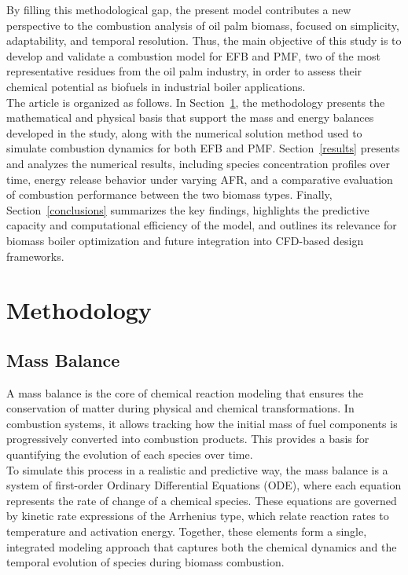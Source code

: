 \documentclass[preprint,12pt]{elsarticle}
\begin{document}
By filling this methodological gap, the present model contributes a new perspective to the combustion analysis of oil palm biomass, focused on simplicity, adaptability, and temporal resolution. Thus, the main objective of this study is to develop and validate a combustion model for EFB and PMF, two of the most representative residues from the oil palm industry, in order to assess their chemical potential as biofuels in industrial boiler applications.\\

The article is organized as follows. In Section~\ref{methodology}, the methodology presents the mathematical and physical basis that support the mass and energy balances developed in the study, along with the numerical solution method used to simulate combustion dynamics for both EFB and PMF. Section~\ref{results} presents and analyzes the numerical results, including species concentration profiles over time, energy release behavior under varying AFR, and a comparative evaluation of combustion performance between the two biomass types. Finally, Section~\ref{conclusions} summarizes the key findings, highlights the predictive capacity and computational efficiency of the model, and outlines its relevance for biomass boiler optimization and future integration into CFD-based design frameworks.

\section{Methodology} \label{methodology}

\subsection{Mass Balance}

A mass balance is the core of chemical reaction modeling that ensures the conservation of matter during physical and chemical transformations. In combustion systems, it allows tracking how the initial mass of fuel components is progressively converted into combustion products. This provides a basis for quantifying the evolution of each species over time.\\

To simulate this process in a realistic and predictive way, the mass balance is a system of first-order Ordinary Differential Equations (ODE), where each equation represents the rate of change of a chemical species. These equations are governed by kinetic rate expressions of the Arrhenius type, which relate reaction rates to temperature and activation energy. Together, these elements form a single, integrated modeling approach that captures both the chemical dynamics and the temporal evolution of species during biomass combustion.
\end{document}
